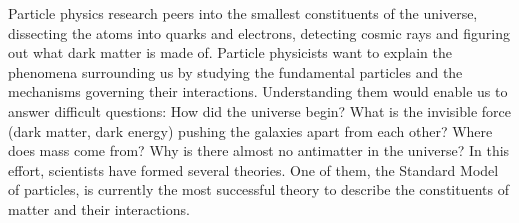 Particle physics research peers into the smallest constituents of the universe, dissecting the atoms into quarks and electrons, detecting cosmic rays and figuring out what dark matter is made of. Particle physicists want to explain the phenomena surrounding us by studying the fundamental particles and the mechanisms governing their interactions. Understanding them would enable us to answer difficult questions: How did the universe begin? What is the invisible force (dark matter, dark energy) pushing the galaxies apart from each other? Where does mass come from? Why is there almost no antimatter in the universe? In this effort, scientists have formed several theories. One of them, the Standard Model of particles, is currently the most successful theory to describe the constituents of matter and their interactions.

